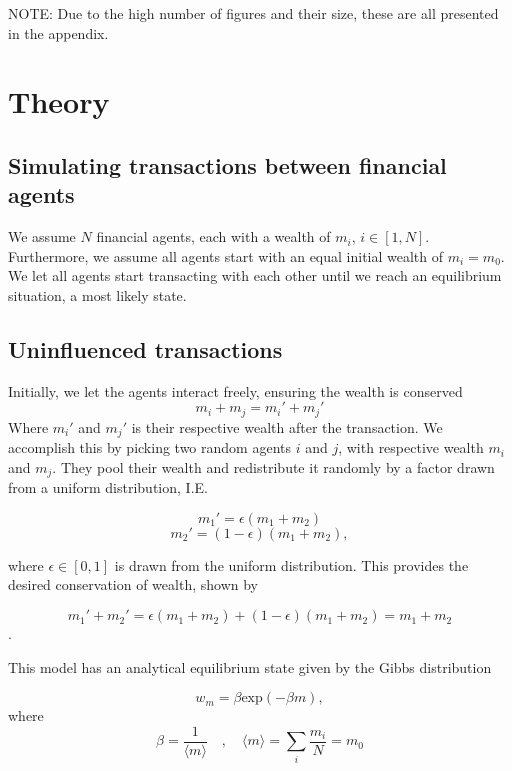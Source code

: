 \documentclass{emulateapj}
\begin{document}
NOTE: Due to the high number of figures and their size, these are all presented in the appendix.

\section{Theory}
\subsection{Simulating transactions between financial agents}
We assume $N$ financial agents, each with a wealth of $m_i$, $i\in [1,N]$. Furthermore, we assume all agents start with an equal initial wealth of $m_i = m_0$. We let all agents start transacting with each other until we reach an equilibrium situation, a most likely state.

\subsection{Uninfluenced transactions}
Initially, we let the agents interact freely, ensuring the wealth is conserved
\begin{equation}
    m_i + m_j = m_i' + m_j'
\end{equation}
Where $m_i'$ and $m_j'$ is their respective wealth after the transaction. We accomplish this by picking two random agents $i$ and $j$, with respective wealth $m_i$ and $m_j$. They pool their wealth and redistribute it randomly by a factor drawn from a uniform distribution, I.E.

\begin{equation}
m_1'=\epsilon(m_1+m_2)
\end{equation}
\begin{equation}
m_2'=(1-\epsilon)(m_1+m_2),
\end{equation}

where $\epsilon \in [0,1]$ is drawn from the uniform distribution. This provides the desired conservation of wealth, shown by

$$m_1'+m_2'=\epsilon(m_1+m_2)+(1-\epsilon)(m_1+m_2)=m_1+m_2$$.

This model has an analytical equilibrium state given by the Gibbs distribution

\begin{equation}
    w_m = \beta \mathrm{exp} \left(-\beta m\right),
\end{equation}
where 
\begin{equation}
    \beta = \frac{1}{\langle m \rangle} \quad , \quad \langle m \rangle = \sum_i \frac{m_i}{N} = m_0
\end{equation}
\end{document}
